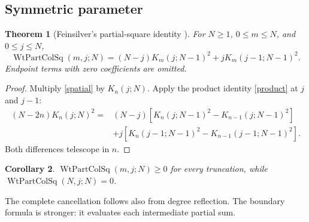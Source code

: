 \documentclass[11pt,reqno]{amsart}
\newtheorem{theorem}{Theorem}[section]
\newtheorem{corollary}[theorem]{Corollary}
\theoremstyle{remark}\newtheorem{remark}[theorem]{Remark}
\DeclareMathOperator{\WtPartColSq}{WtPartColSq}
\begin{document}
\subsection{Symmetric parameter}
\begin{theorem}[Feinsilver's partial-square identity \cite{Feinsilver2016}]\label{partialsquare}
For $N\ge1$, $0\le m\le N$, and $0\le j\le N$,
\begin{equation}\label{partialformula}
\boxed{\WtPartColSq(m,j;N)
=(N-j)K_m(j;N-1)^2+jK_m(j-1;N-1)^2.}
\end{equation}
Endpoint terms with zero coefficients are omitted.
\end{theorem}
\begin{proof}
Multiply \eqref{spatial} by $K_n(j;N)$. Apply the product identity \eqref{product} at $j$ and $j-1$:
\begin{align*}
(N-2n)K_n(j;N)^2
={}&(N-j)[K_n(j;N-1)^2-K_{n-1}(j;N-1)^2]\\
&+j[K_n(j-1;N-1)^2-K_{n-1}(j-1;N-1)^2].
\end{align*}
Both differences telescope in $n$.
\end{proof}
\begin{corollary}
$\WtPartColSq(m,j;N)\ge0$ for every truncation, while $\WtPartColSq(N,j;N)=0$.
\end{corollary}
The complete cancellation follows also from degree reflection. The boundary formula is stronger: it evaluates each intermediate partial sum.
\end{document}
